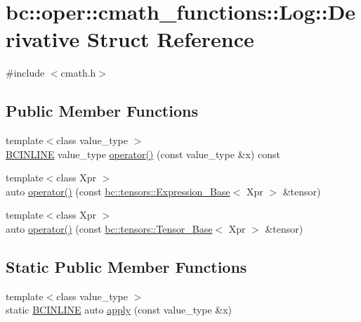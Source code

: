 \hypertarget{structbc_1_1oper_1_1cmath__functions_1_1Log_1_1Derivative}{}\section{bc\+:\+:oper\+:\+:cmath\+\_\+functions\+:\+:Log\+:\+:Derivative Struct Reference}
\label{structbc_1_1oper_1_1cmath__functions_1_1Log_1_1Derivative}


{\ttfamily \#include $<$cmath.\+h$>$}

\subsection*{Public Member Functions}
\begin{DoxyCompactItemize}
\item 
{\footnotesize template$<$class value\+\_\+type $>$ }\\\hyperlink{common_8h_a6699e8b0449da5c0fafb878e59c1d4b1}{B\+C\+I\+N\+L\+I\+NE} value\+\_\+type \hyperlink{structbc_1_1oper_1_1cmath__functions_1_1Log_1_1Derivative_ab7b29a662723175f581562b726584f92}{operator()} (const value\+\_\+type \&x) const
\item 
{\footnotesize template$<$class Xpr $>$ }\\auto \hyperlink{structbc_1_1oper_1_1cmath__functions_1_1Log_1_1Derivative_a25c7f3e1f0343d4bd510de5deb4243cb}{operator()} (const \hyperlink{classbc_1_1tensors_1_1Expression__Base}{bc\+::tensors\+::\+Expression\+\_\+\+Base}$<$ Xpr $>$ \&tensor)
\item 
{\footnotesize template$<$class Xpr $>$ }\\auto \hyperlink{structbc_1_1oper_1_1cmath__functions_1_1Log_1_1Derivative_a38331d7deefb0dddb93ade53de03b048}{operator()} (const \hyperlink{classbc_1_1tensors_1_1Tensor__Base}{bc\+::tensors\+::\+Tensor\+\_\+\+Base}$<$ Xpr $>$ \&tensor)
\end{DoxyCompactItemize}
\subsection*{Static Public Member Functions}
\begin{DoxyCompactItemize}
\item 
{\footnotesize template$<$class value\+\_\+type $>$ }\\static \hyperlink{common_8h_a6699e8b0449da5c0fafb878e59c1d4b1}{B\+C\+I\+N\+L\+I\+NE} auto \hyperlink{structbc_1_1oper_1_1cmath__functions_1_1Log_1_1Derivative_ab8e3622674b071ab0f69b13f8a5cfe02}{apply} (const value\+\_\+type \&x)
\end{DoxyCompactItemize}


